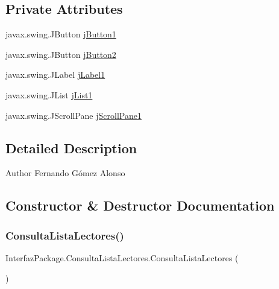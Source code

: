 \subsection*{Private Attributes}
\begin{DoxyCompactItemize}
\item 
javax.\+swing.\+J\+Button \mbox{\hyperlink{class_interfaz_package_1_1_consulta_lista_lectores_a682904c76af705735a4b6c2b4ae04c86}{j\+Button1}}
\item 
javax.\+swing.\+J\+Button \mbox{\hyperlink{class_interfaz_package_1_1_consulta_lista_lectores_a7f8eecc27df6bdc9fc291b6e6c83dc61}{j\+Button2}}
\item 
javax.\+swing.\+J\+Label \mbox{\hyperlink{class_interfaz_package_1_1_consulta_lista_lectores_a527df4a58dc048d5d173177fa32f0764}{j\+Label1}}
\item 
javax.\+swing.\+J\+List \mbox{\hyperlink{class_interfaz_package_1_1_consulta_lista_lectores_adfbed0d9d2c73d12354e8e7d39d3d074}{j\+List1}}
\item 
javax.\+swing.\+J\+Scroll\+Pane \mbox{\hyperlink{class_interfaz_package_1_1_consulta_lista_lectores_a787ac57dc3272376d42c09c0c7f1ef71}{j\+Scroll\+Pane1}}
\end{DoxyCompactItemize}


\subsection{Detailed Description}
\begin{DoxyAuthor}{Author}
Fernando Gómez Alonso 
\end{DoxyAuthor}


\subsection{Constructor \& Destructor Documentation}
\mbox{\label{class_interfaz_package_1_1_consulta_lista_lectores_a2068efbdca2416de4628a028be002f0c}} 
\subsubsection{\texorpdfstring{Consulta\+Lista\+Lectores()}{ConsultaListaLectores()}}
{\footnotesize\ttfamily Interfaz\+Package.\+Consulta\+Lista\+Lectores.\+Consulta\+Lista\+Lectores (\begin{DoxyParamCaption}{ }\end{DoxyParamCaption})\hspace{0.3cm}{\ttfamily [inline]}}

